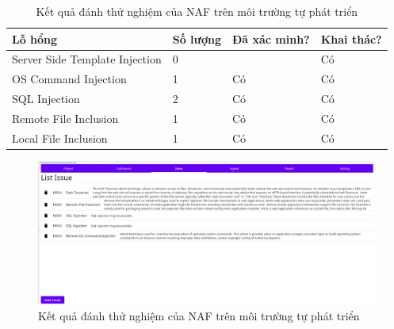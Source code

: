 \documentclass[./../main.tex]{subfiles}
\begin{document}
\begin{table}[H]
	\begin{tabular}{|l|l|l|l|}
		\hline
		\textbf{Lỗ hổng}               & \textbf{Số lượng} & \textbf{Đã xác minh?} & \textbf{Khai thác?} \\ \hline
		Server Side Template Injection & 0                 &                       & Có                  \\ \hline
		OS Command Injection           & 1                 & Có                    & Có                  \\ \hline
		SQL Injection                  & 2                 & Có                    & Có                  \\ \hline
		Remote File Inclusion          & 1                 & Có                    & Có                  \\ \hline
		Local File Inclusion           & 1                 & Có                    & Có                  \\ \hline
	\end{tabular}
	\caption{Kết quả đánh thử nghiệm của NAF trên môi trường tự phát triển}
\end{table}

\begin{figure}[h!]
	\includegraphics[width=\linewidth]{./images/result_test.png}
	\caption{Kết quả đánh thử nghiệm của NAF trên môi trường tự phát triển}
	\label{fig:result_test}
\end{figure}
\end{document}
